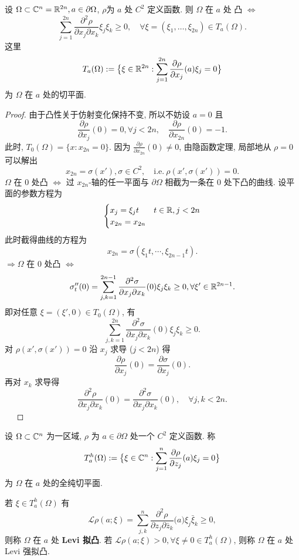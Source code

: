 \begin{proposition}
    设 $\Omega \subset {\mathbb C}^n={\mathbb R}^{2n}, a \in \partial \Omega $, $\rho $为 $a$ 处 $C^2$ 定义函数. 则 $\Omega $ 在 $a$ 处 凸 $\iff $ 
    $$ \sum_{j=1}^{2n} \frac{\partial^2 \rho  }{\partial x_j \partial x_k} \xi _j \xi _k \geq 0, \quad \forall \xi =(\xi _1,\dots,\xi _{2n}) \in T_{a}(\Omega ).$$
    这里  
    $$T_a (\Omega ):=\big\{\xi \in {\mathbb R}^{2n}: \sum_{j=1}^{2n}\frac{\partial \rho }{\partial x_j}(a)\xi _j=0\big\}$$
    为 $\Omega $ 在 $a$ 处的切平面.        
\end{proposition}
\begin{proof}
    由于凸性关于仿射变化保持不变, 所以不妨设 $a=0$ 且 $$\frac{\partial \rho }{\partial x_j}(0)=0, \forall j <2n, \quad \frac{\partial \rho }{\partial x_{2n}}(0)=-1.$$  
    此时, $T_{0}(\Omega )=\{x:x_{2n}=0\}$.
    因为 $\frac{\partial \rho }{\partial x_{2n}}(0)\neq 0$, 由隐函数定理, 局部地从 $\rho =0$ 可以解出 
    $$ x_{2n}=\sigma (x'), \sigma \in C^2, \quad \text{i.e.}~\rho (x',\sigma (x'))=0. $$  
    $\Omega $ 在 $0$ 处凸 $\iff $ 过 $x_{2n}$-轴的任一平面与 $\partial \Omega $ 相截为一条在 $0$ 处下凸的曲线. 
    设平面的参数方程为 
    $$ \begin{cases}
        x_j=\xi _j t &\text{} t \in {\mathbb R}, j<2n\\
        x_{2n}=x_{2n} &\text{} \\
    \end{cases}  $$      
    此时截得曲线的方程为 
    $$ x_{2n}=\sigma (\xi _1 t, \cdots ,\xi _{2n-1}t). $$
    $\Rightarrow \Omega $ 在 $0$ 处凸 $\iff $
    $$ \sigma ''_t(0)=\sum_{j,k=1}^{2n-1} \frac{\partial^2 \sigma  }{\partial x_j \partial x_k}(0) \xi _j \xi_k \geq 0, \forall \xi ' \in {\mathbb R}^{2n-1}. $$
    即对任意 $\xi =(\xi ',0) \in T_0(\Omega )$, 有 
        $$ \sum_{j,k=1}^{2n} \frac{\partial^2 \sigma  }{\partial x_j \partial x_k}(0) \xi _j \xi_k \geq 0. $$
    对 $\rho (x',\sigma (x'))=0$ 沿 $x_j$ 求导 ($j<2n$) 得 
    $$ \frac{\partial \rho }{\partial x_j}(0)=\frac{\partial \sigma  }{\partial x_j}(0). $$  
    再对 $x_k$ 求导得 
    $$ \frac{\partial^2 \rho }{\partial x_j \partial x_k}(0)=\frac{\partial^2 \sigma  }{\partial x_j \partial x_k}(0), \quad \forall j,k <2n. $$ 
    ~~
\end{proof}

\begin{definition}
    设 $\Omega \subset {\mathbb C}^n$ 为一区域, $\rho $ 为 $a \in \partial \Omega $ 处一个 $C^2$ 定义函数. 称 
    $$ T_{a}^{h}(\Omega ):=\big\{\xi \in {\mathbb C}^n:\sum_{j=1}^{n}\frac{\partial \rho }{\partial z_j}(a) \xi _j=0 \big\}$$
    为 $\Omega $ 在 $a$ 处的全纯切平面.     
\end{definition}
\begin{definition}
    若 $\xi \in T_{a}^{h}(\Omega )$ 有 
    $$ \mathcal{L}\rho (a;\xi )=\sum_{j,k}^{n} \frac{\partial^2 \rho  }{\partial z_j \partial \bar{z}_k}\big(a\big) \xi _j \bar{\xi} _k \geq 0,$$ 
    则称 $\Omega $ 在 $a$ 处 \textbf{Levi 拟凸}.  
    若 $\mathcal{L}\rho (a;\xi )>0, \forall \xi \neq 0 \in T_{a}^{h}(\Omega )$, 
    则称 $\Omega $ 在 $a$ 处 Levi 强拟凸. 
\end{definition}

